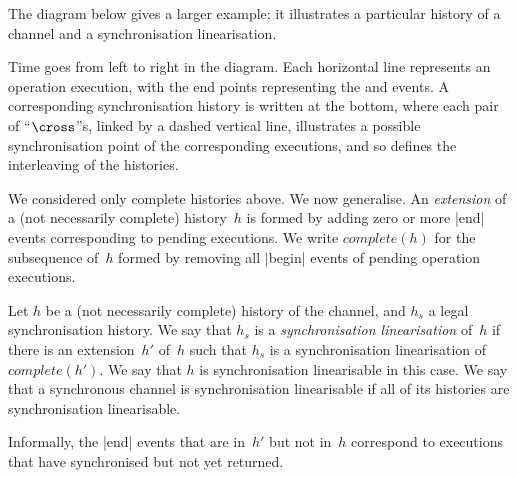 The diagram below gives a larger example; it illustrates a particular history
of a channel and a synchronisation linearisation.
%
\begin{center}
\unScalaMid
{}
\scalaMid
\end{center}
%
Time goes from left to right in the diagram.  Each horizontal line represents
an operation execution, with the end points representing the  and
 events.  A corresponding synchronisation history is written at the
bottom, where each pair of ``$\cross$''s, linked by a dashed vertical line,
illustrates a possible synchronisation point of the corresponding executions,
and so defines the interleaving of the histories.

We considered only complete histories above.  We now generalise.  An
\emph{extension} of a (not necessarily complete) history~$h$ is formed by
adding zero or more |end| events corresponding to pending executions.  We
write $complete(h)$ for the subsequence of~$h$ formed by removing all |begin|
events of pending operation executions.
%
\begin{definition}
Let $h$ be a (not necessarily complete) history of the channel, and $h_s$ a
legal synchronisation history.  We say that $h_s$ is a \emph{synchronisation
  linearisation} of~$h$ if there is an extension~$h'$ of~$h$ such that $h_s$
is a synchronisation linearisation of $complete(h')$.  We say that $h$ is
synchronisation linearisable in this case.
%
We say that a synchronous channel is synchronisation linearisable if all of
its histories are synchronisation linearisable.
\end{definition}
%
Informally, the |end| events that are in~$h'$ but not in~$h$ correspond to
executions that have synchronised but not yet returned.

